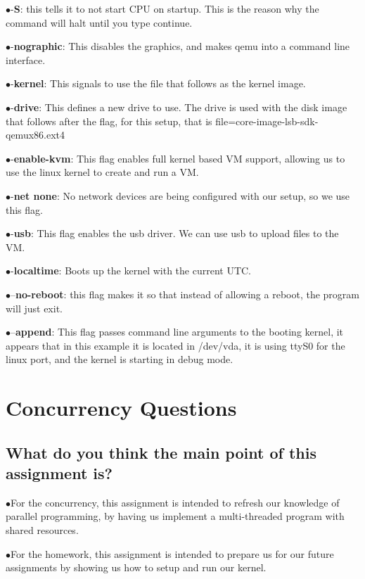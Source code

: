 \documentclass[letterpaper,10pt,fleqn,draftclsnofoot,onecolumn]{IEEEtran}
\begin{document}
	$\bullet$-{\bf S}: this tells it to not start CPU on startup. This is the reason why the command will halt until you type continue.
	
	$\bullet$-{\bf nographic}: This disables the graphics, and makes qemu into a command line interface.
	
	$\bullet$-{\bf kernel}: This signals to use the file that follows as the kernel image. 
	
	$\bullet$-{\bf drive}: This defines a new drive to use. The drive is used with the disk image that follows after the flag, for this setup, that is file=core-image-lsb-sdk-qemux86.ext4
	
	$\bullet$-{\bf enable-kvm}: This flag enables full kernel based VM support, allowing us to use the linux kernel to create and run a VM.
	
	$\bullet$-{\bf net none}: No network devices are being configured with our setup, so we use this flag.
	
	$\bullet$-{\bf usb}: This flag enables the usb driver. We can use usb to upload files to the VM. 
	
	$\bullet$-{\bf localtime}: Boots up the kernel with the current UTC.
	
	$\bullet$--{\bf no-reboot}: this flag makes it so that instead of allowing a reboot, the program will just exit.
	
	$\bullet$--{\bf append}: This flag passes command line arguments to the booting kernel, it appears that in this example it is located in /dev/vda, it is using ttyS0 for the linux port, and the kernel is starting in debug mode.
	
	\section*{Concurrency Questions}
	\subsection{What do you think the main point of this assignment is?}
	$\bullet$For the concurrency, this assignment is intended to refresh our knowledge of parallel programming, by having us implement a multi-threaded program with shared resources.
	
	$\bullet$For the homework, this assignment is intended to prepare us for our future assignments by showing us how to setup and run our kernel.
	
\end{document}
